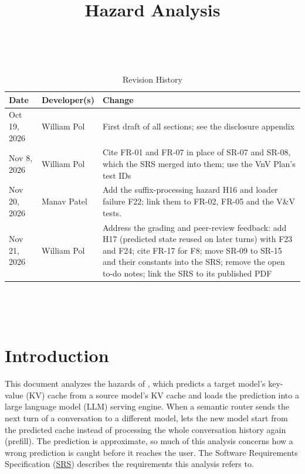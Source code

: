 \documentclass{article}
\title{Hazard Analysis\\\progname}
\author{\authname}
\date{}
\newcommand{\srs}{\href{https://tandemkv.github.io/Tandem/SRS-Volere/SRS.pdf}{SRS}}
\begin{document}
\maketitle
\thispagestyle{empty}

~\newpage


\begin{table}[hp]
\caption{Revision History} \label{TblRevisionHistory}
\begin{tabularx}{\textwidth}{llX}
\toprule
\textbf{Date} & \textbf{Developer(s)} & \textbf{Change}\\
\midrule
Oct 19, 2026 & William Pol & First draft of all sections; see the
disclosure appendix\\
Nov 8, 2026 & William Pol & Cite FR-01 and FR-07 in place of SR-07 and
SR-08, which the SRS merged into them; use the VnV Plan's test IDs\\
Nov 20, 2026 & Manav Patel & Add the suffix-processing hazard H16 and
loader failure F22; link them to FR-02, FR-05 and the V\&V tests.\\
Nov 21, 2026 & William Pol & Address the grading and peer-review feedback:
add H17 (predicted state reused on later turns) with F23 and F24; cite FR-17
for F8; move SR-09 to SR-15 and their constants into the SRS; remove the
open to-do notes; link the SRS to its published PDF\\
\bottomrule
\end{tabularx}
\end{table}

~\newpage

\tableofcontents

~\newpage


\section{Introduction}
\label{sec:intro}

This document analyzes the hazards of \progname{}, which predicts a target
model's key-value (KV) cache from a source model's KV cache and loads the
prediction into a large language model (LLM) serving engine. When a
semantic router sends the next turn of a conversation to a different model,
\progname{} lets the new model start from the predicted cache instead of
processing the whole conversation history again (prefill). The prediction
is approximate, so much of this analysis concerns how a wrong prediction is
caught before it reaches the user. The Software Requirements
Specification (\srs{}) \cite{TandemSRS} describes the requirements this
analysis refers to.
\end{document}
